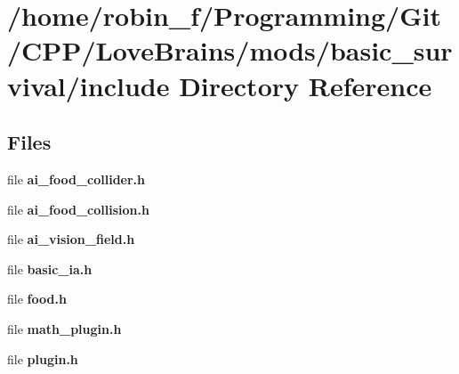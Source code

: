 \section{/home/robin\+\_\+f/\+Programming/\+Git/\+C\+P\+P/\+Love\+Brains/mods/basic\+\_\+survival/include Directory Reference}
\label{dir_ddfaf5c6dbad40c3ed677255d4ed34ef}
\subsection*{Files}
\begin{DoxyCompactItemize}
\item 
file {\bfseries ai\+\_\+food\+\_\+collider.\+h}
\item 
file {\bfseries ai\+\_\+food\+\_\+collision.\+h}
\item 
file {\bfseries ai\+\_\+vision\+\_\+field.\+h}
\item 
file {\bfseries basic\+\_\+ia.\+h}
\item 
file {\bfseries food.\+h}
\item 
file {\bfseries math\+\_\+plugin.\+h}
\item 
file {\bfseries plugin.\+h}
\end{DoxyCompactItemize}
